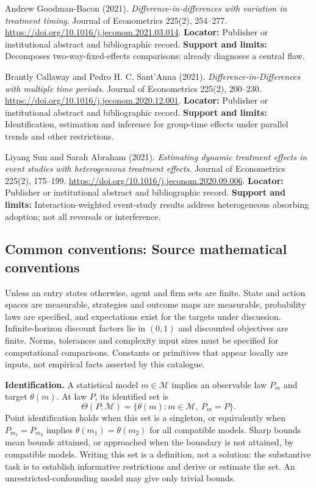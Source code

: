 \documentclass[11pt,a4paper]{article}
\begin{document}
\begin{enumerate}[label={[\textnormal{S}\arabic*]},leftmargin=*]

\item Andrew Goodman-Bacon (2021). \emph{Difference-in-differences with variation in treatment timing}. Journal of Econometrics 225(2), 254–277. \url{https://doi.org/10.1016/j.jeconom.2021.03.014}. \textbf{Locator:} Publisher or institutional abstract and bibliographic record. \textbf{Support and limits:} Decomposes two-way-fixed-effects comparisons; already diagnoses a central flaw.

\item Brantly Callaway and Pedro H. C. Sant’Anna (2021). \emph{Difference-in-Differences with multiple time periods}. Journal of Econometrics 225(2), 200–230. \url{https://doi.org/10.1016/j.jeconom.2020.12.001}. \textbf{Locator:} Publisher or institutional abstract and bibliographic record. \textbf{Support and limits:} Identification, estimation and inference for group-time effects under parallel trends and other restrictions.

\item Liyang Sun and Sarah Abraham (2021). \emph{Estimating dynamic treatment effects in event studies with heterogeneous treatment effects}. Journal of Econometrics 225(2), 175–199. \url{https://doi.org/10.1016/j.jeconom.2020.09.006}. \textbf{Locator:} Publisher or institutional abstract and bibliographic record. \textbf{Support and limits:} Interaction-weighted event-study results address heterogeneous absorbing adoption; not all reversals or interference.

\end{enumerate}

\subsection*{Common conventions: Source mathematical conventions}

Unless an entry states otherwise, agent and firm sets are finite. State and action spaces are measurable, strategies and outcome maps are measurable, probability laws are specified, and expectations exist for the targets under discussion. Infinite-horizon discount factors lie in $(0,1)$ and discounted objectives are finite. Norms, tolerances and complexity input sizes must be specified for computational comparisons. Constants or primitives that appear locally are inputs, not empirical facts asserted by this catalogue.

\textbf{Identification.} A statistical model $m\in\mathcal M$ implies an observable law $P_m$ and target $\theta(m)$. At law $P$, its identified set is
\[
\Theta(P;\mathcal M)=\{\theta(m):m\in\mathcal M,\ P_m=P\}.
\]
Point identification holds when this set is a singleton, or equivalently when $P_{m_1}=P_{m_2}$ implies $\theta(m_1)=\theta(m_2)$ for all compatible models. Sharp bounds mean bounds attained, or approached when the boundary is not attained, by compatible models. Writing this set is a definition, not a solution: the substantive task is to establish informative restrictions and derive or estimate the set. An unrestricted-confounding model may give only trivial bounds.
\end{document}
